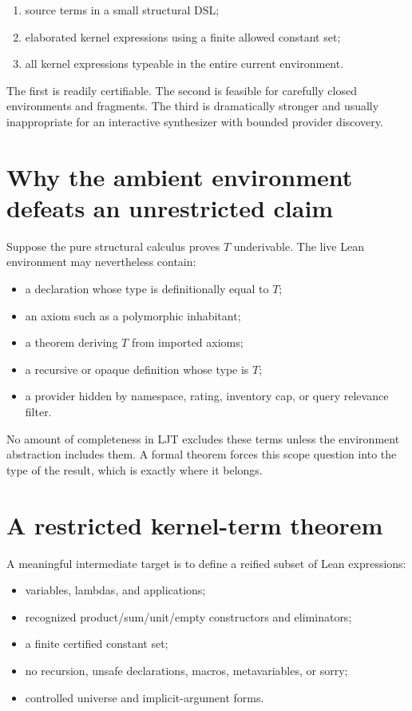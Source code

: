 \documentclass[11pt,letterpaper,openany]{report}
\theoremstyle{definition}
\theoremstyle{remark}
\begin{document}
\begin{enumerate}
\item source terms in a small structural DSL;
\item elaborated kernel expressions using a finite allowed constant set;
\item all kernel expressions typeable in the entire current environment.
\end{enumerate}

The first is readily certifiable. The second is feasible for carefully closed environments and fragments. The third is dramatically stronger and usually inappropriate for an interactive synthesizer with bounded provider discovery.

\section{Why the ambient environment defeats an unrestricted claim}

Suppose the pure structural calculus proves \(T\) underivable. The live Lean environment may nevertheless contain:

\begin{itemize}
\item a declaration whose type is definitionally equal to \(T\);
\item an axiom such as a polymorphic inhabitant;
\item a theorem deriving \(T\) from imported axioms;
\item a recursive or opaque definition whose type is \(T\);
\item a provider hidden by namespace, rating, inventory cap, or query relevance filter.
\end{itemize}

No amount of completeness in LJT excludes these terms unless the environment abstraction includes them. A formal theorem forces this scope question into the type of the result, which is exactly where it belongs.

\section{A restricted kernel-term theorem}

A meaningful intermediate target is to define a reified subset of Lean expressions:

\begin{itemize}
\item variables, lambdas, and applications;
\item recognized product/sum/unit/empty constructors and eliminators;
\item a finite certified constant set;
\item no recursion, unsafe declarations, macros, metavariables, or sorry;
\item controlled universe and implicit-argument forms.
\end{itemize}
\end{document}
